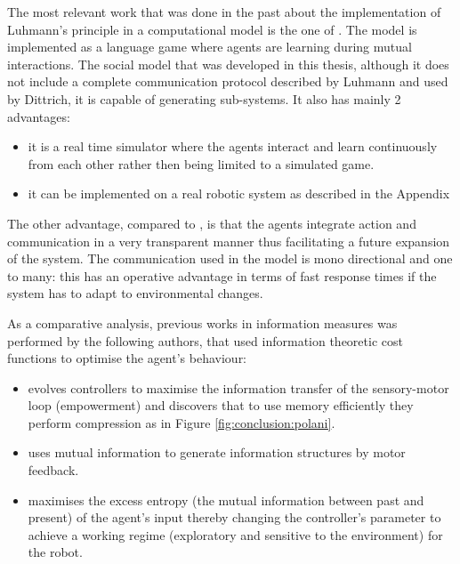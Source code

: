 The most relevant work that was done in the past about the implementation
of Luhmann's principle in a computational model is the one of \citet{SocialOrderScalability}.
The model is implemented as a language game where agents are learning
during mutual interactions.
The social model that was developed in this thesis, although it does not include
 a complete communication protocol described by Luhmann and used by Dittrich,
it is capable of generating sub-systems.
It also has mainly 2 advantages:
\begin{itemize}
 \item it is a real time simulator where the agents interact and learn continuously
 from each other rather then being limited to a simulated game.
 \item it can be implemented on a real robotic system as described in the Appendix 
\end{itemize}

The other advantage, compared to \citet{SocialOrderScalability}, is that
the agents integrate action and communication in a very transparent manner
thus facilitating a future expansion of the system.
The communication used in the model is mono directional and one to many:
this has an operative advantage in terms of fast response times if the
system has to adapt to environmental changes.

As a comparative analysis, previous works in information measures was performed by the following authors,
that used information theoretic cost functions to optimise the agent's behaviour:
\begin{itemize}
\item \citet{organizationInfo} evolves controllers to maximise the information transfer
of the sensory-motor loop (empowerment) and discovers that to use memory efficiently they perform 
compression as in Figure \ref{fig:conclusion:polani}.
\item \citet{LungarellaInformation} uses mutual information to generate information structures by motor feedback.
\item \citet{Ay2008:PredInformation} maximises the excess entropy (the mutual information between past and present) 
 of the agent's input thereby changing the controller's parameter to achieve a 
 working regime (exploratory and sensitive to the environment) for the robot.
\end{itemize}

